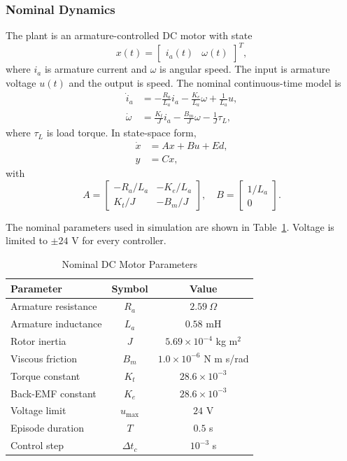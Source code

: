 \documentclass[conference]{IEEEtran}
\begin{document}
\subsubsection{Nominal Dynamics}
The plant is an armature-controlled DC motor with state
\begin{equation}
x(t) = \begin{bmatrix} i_a(t) & \omega(t) \end{bmatrix}^{T},
\end{equation}
where $i_a$ is armature current and $\omega$ is angular speed. The input is armature voltage $u(t)$ and the output is speed. The nominal continuous-time model is
\begin{align}
\dot{i}_a &= -\frac{R_a}{L_a} i_a - \frac{K_e}{L_a}\omega + \frac{1}{L_a}u, \\
\dot{\omega} &= \frac{K_t}{J} i_a - \frac{B_m}{J}\omega - \frac{1}{J}\tau_L,
\end{align}
where $\tau_L$ is load torque. In state-space form,
\begin{align}
\dot{x} &= Ax + Bu + Ed, \\
y &= Cx,
\end{align}
with
\begin{equation}
A =
\begin{bmatrix}
-R_a/L_a & -K_e/L_a \\
K_t/J & -B_m/J
\end{bmatrix},
\quad
B =
\begin{bmatrix}
1/L_a \\
0
\end{bmatrix}.
\end{equation}

The nominal parameters used in simulation are shown in Table~\ref{tab:parameters}. Voltage is limited to $\pm 24$ V for every controller.

\begin{table}[!htbp]
\caption{Nominal DC Motor Parameters}
\label{tab:parameters}
\centering
\begin{tabular}{lcc}
\hline
Parameter & Symbol & Value \\
\hline
Armature resistance & $R_a$ & $2.59~\Omega$ \\
Armature inductance & $L_a$ & $0.58$ mH \\
Rotor inertia & $J$ & $5.69 \times 10^{-4}$ kg m$^2$ \\
Viscous friction & $B_m$ & $1.0 \times 10^{-6}$ N m s/rad \\
Torque constant & $K_t$ & $28.6 \times 10^{-3}$ \\
Back-EMF constant & $K_e$ & $28.6 \times 10^{-3}$ \\
Voltage limit & $u_{\max}$ & $24$ V \\
Episode duration & $T$ & $0.5$ s \\
Control step & $\Delta t_c$ & $10^{-3}$ s \\
\hline
\end{tabular}
\end{table}
\end{document}
